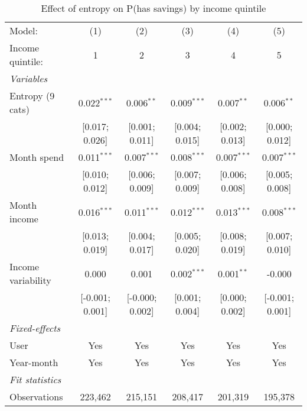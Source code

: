 
\begin{table}[htbp]
   \centering
   \tiny
   \begin{threeparttable}[b]
      \caption{\label{tab:reg_has_inflows_entropy_tag_z_inc_quint} Effect of entropy on P(has savings) by income quintile}
      \begin{tabular}{lccccc}
         \tabularnewline \midrule \midrule
         Model:             & (1)             & (2)             & (3)            & (4)            & (5)\\  
         Income quintile:   & 1               & 2               & 3              & 4              & 5 \\   
         \midrule
         \emph{Variables}\\
         Entropy (9 cats)   & 0.022$^{***}$   & 0.006$^{**}$    & 0.009$^{***}$  & 0.007$^{**}$   & 0.006$^{**}$\\   
                            & [0.017; 0.026]  & [0.001; 0.011]  & [0.004; 0.015] & [0.002; 0.013] & [0.000; 0.012]\\   
         Month spend        & 0.011$^{***}$   & 0.007$^{***}$   & 0.008$^{***}$  & 0.007$^{***}$  & 0.007$^{***}$\\   
                            & [0.010; 0.012]  & [0.006; 0.009]  & [0.007; 0.009] & [0.006; 0.008] & [0.005; 0.008]\\   
         Month income       & 0.016$^{***}$   & 0.011$^{***}$   & 0.012$^{***}$  & 0.013$^{***}$  & 0.008$^{***}$\\   
                            & [0.013; 0.019]  & [0.004; 0.017]  & [0.005; 0.020] & [0.008; 0.019] & [0.007; 0.010]\\   
         Income variability & 0.000           & 0.001           & 0.002$^{***}$  & 0.001$^{**}$   & -0.000\\   
                            & [-0.001; 0.001] & [-0.000; 0.002] & [0.001; 0.004] & [0.000; 0.002] & [-0.001; 0.001]\\   
         \midrule
         \emph{Fixed-effects}\\
         User               & Yes             & Yes             & Yes            & Yes            & Yes\\  
         Year-month         & Yes             & Yes             & Yes            & Yes            & Yes\\  
         \midrule
         \emph{Fit statistics}\\
         Observations       & 223,462         & 215,151         & 208,417        & 201,319        & 195,378\\  

\end{tabular}
\end{threeparttable}
\end{table}
